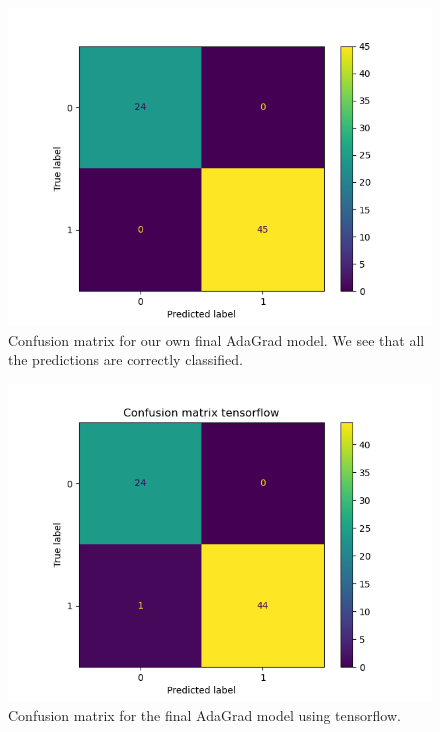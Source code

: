 \documentclass{article}
\begin{document}
\begin{figure}
      \centering
      \includegraphics[scale=0.8]{confusion_matrix_nn}
      \caption{Confusion matrix for our own final AdaGrad model. We see that all the
            predictions are correctly classified.}
      \label{confusion-nn-final}
\end{figure}

\begin{figure}
      \centering
      \includegraphics[scale=0.8]{confusion_matrix_tensorflow}
      \caption{Confusion matrix for the final AdaGrad model using tensorflow.}
      \label{confusion-nn-tf}
\end{figure}
\end{document}
